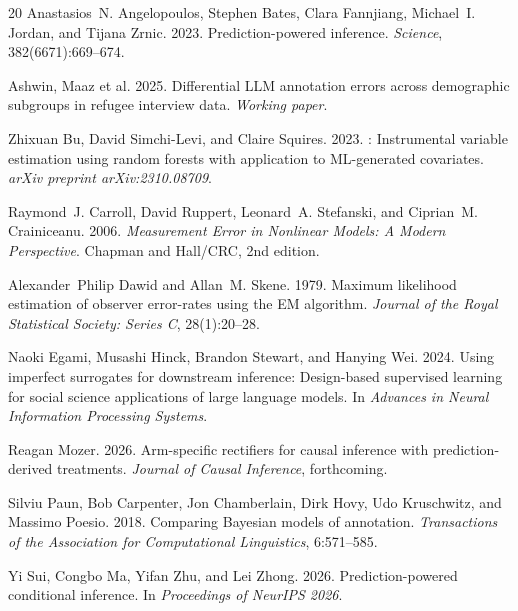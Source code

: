 \documentclass[11pt,a4paper]{article}
\begin{document}
\begin{thebibliography}{20}
Anastasios~N. Angelopoulos, Stephen Bates, Clara Fannjiang, Michael~I. Jordan, and Tijana Zrnic. 2023.
\newblock Prediction-powered inference.
\newblock \emph{Science}, 382(6671):669--674.

Ashwin, Maaz et al. 2025.
\newblock Differential {LLM} annotation errors across demographic subgroups in refugee interview data.
\newblock \emph{Working paper}.

Zhixuan Bu, David Simchi-Levi, and Claire Squires. 2023.
: Instrumental variable estimation using random forests with application to {ML}-generated covariates.
\newblock \emph{arXiv preprint arXiv:2310.08709}.

Raymond~J. Carroll, David Ruppert, Leonard~A. Stefanski, and Ciprian~M. Crainiceanu. 2006.
\newblock \emph{Measurement Error in Nonlinear Models: A Modern Perspective}.
\newblock Chapman and Hall/CRC, 2nd edition.

Alexander~Philip Dawid and Allan~M. Skene. 1979.
\newblock Maximum likelihood estimation of observer error-rates using the {EM} algorithm.
\newblock \emph{Journal of the Royal Statistical Society: Series C}, 28(1):20--28.

Naoki Egami, Musashi Hinck, Brandon Stewart, and Hanying Wei. 2024.
\newblock Using imperfect surrogates for downstream inference: Design-based supervised learning for social science applications of large language models.
\newblock In \emph{Advances in Neural Information Processing Systems}.

Reagan Mozer. 2026.
\newblock Arm-specific rectifiers for causal inference with prediction-derived treatments.
\newblock \emph{Journal of Causal Inference}, forthcoming.

Silviu Paun, Bob Carpenter, Jon Chamberlain, Dirk Hovy, Udo Kruschwitz, and Massimo Poesio. 2018.
\newblock Comparing {Bayesian} models of annotation.
\newblock \emph{Transactions of the Association for Computational Linguistics}, 6:571--585.

Yi Sui, Congbo Ma, Yifan Zhu, and Lei Zhong. 2026.
\newblock Prediction-powered conditional inference.
\newblock In \emph{Proceedings of NeurIPS 2026}.
\end{thebibliography}
\end{document}
